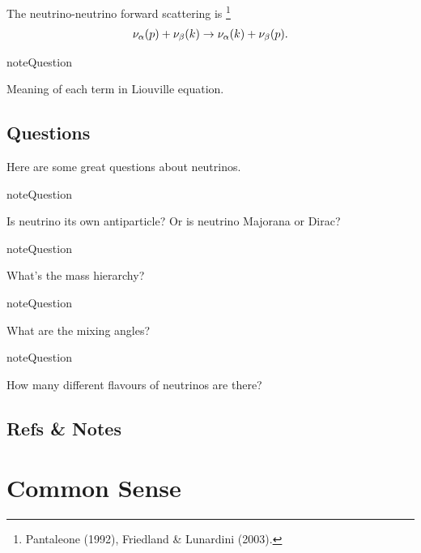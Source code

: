 \documentclass[letterpaper,12pt,english]{sphinxmanual}
\begin{document}
The neutrino-neutrino forward scattering is \footnote[2]{
Pantaleone (1992), Friedland \& Lunardini (2003).
}
\begin{gather}
\begin{split}\nu_\alpha (p) + \nu_\beta (k) \to \nu_\alpha (k)+\nu_\beta (p).\end{split}\notag
\end{gather}
\begin{notice}{note}{Question}

Meaning of each term in Liouville equation.
\end{notice}


\section{Questions}
\label{preliminary:questions}
Here are some great questions about neutrinos.

\begin{notice}{note}{Question}

Is neutrino its own antiparticle? Or is neutrino Majorana or Dirac?
\end{notice}

\begin{notice}{note}{Question}

What's the mass hierarchy?
\end{notice}

\begin{notice}{note}{Question}

What are the mixing angles?
\end{notice}

\begin{notice}{note}{Question}

How many different flavours of neutrinos are there?
\end{notice}


\section{Refs \& Notes}
\label{preliminary:refs-notes}

\chapter{Common Sense}
\label{commonsense:common-sense}\label{commonsense::doc}
\end{document}
